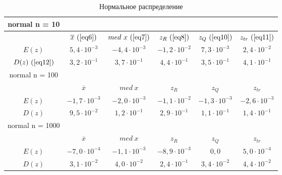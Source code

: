\begin{table}[H]
    \centering
    \begin{tabular}{ |c|c|c|c|c|c| } 
 \hline
 normal n = 10 & & & & & \\ 
 \hline
  &$\overline{x}\ (\ref{eq6})$ & $med\ x\ (\ref{eq7})$ & $z_{R}\ (\ref{eq8})$ & $z_{Q}\ (\ref{eq10})$ & $z_{tr}\ (\ref{eq11})$\\ 
 \hline
 $E(z)$ & $5,4 \cdot 10^{-3}$ & $-4,4\cdot 10^{-3}$ & $-1,2 \cdot 10^{-2}$ & $7,3 \cdot 10^{-3}$ & $2,4 \cdot 10^{-2}$ \\ 
 \hline
 $D(z)\ (\ref{eq12})$ & $3,2\cdot 10^{-1}$ & $3,7 \cdot 10^{-1}$ & $4,4 \cdot 10^{-1}$ & $3,5 \cdot 10^{-1}$ & $4,1 \cdot 10^{-1}$ \\ 
 \hline\hline
 normal n = 100 & & & & & \\
 \hline
 &$\overline{x}$ & $med\ x$ & $z_{R}$ & $z_{Q}$ & $z_{tr}$\\ 
 \hline
 $E(z)$ & $-1,7 \cdot 10^{-3}$ & $-2,0 \cdot 10^{-3}$ & $-1,1 \cdot 10^{-2}$ & $-1,3 \cdot 10^{-3}$ & $-2,6 \cdot 10^{-3}$ \\ 
 \hline
 $D(z)$ & $9,5 \cdot 10^{-2}$ & $1,2 \cdot 10^{-1}$ & $2,9 \cdot 10^{-1}$ & $1,1 \cdot 10^{-1}$ & $1,4 \cdot 10^{-1}$ \\ 
 \hline\hline
 normal n = 1000 & & & & & \\
 \hline
 &$\overline{x}$ & $med\ x$ & $z_{R}$ & $z_{Q}$ & $z_{tr}$\\ 
 \hline
 $E(z)$ & $-7,0 \cdot 10^{-4}$ & $-1,1 \cdot 10^{-3}$ & $-8,9 \cdot 10^{-3}$ & $0,0 $ & $5,0 \cdot 10^{-4}$ \\ 
 \hline
 $D(z)$ & $3,1 \cdot 10^{-2}$ & $4,0 \cdot 10^{-2}$ & $2,4 \cdot 10^{-1}$ & $3,4 \cdot 10^{-2}$ & $4,4 \cdot 10^{-2}$ \\
 \hline
\end{tabular}
    \caption{Нормальное распределение}
    \label{table:1}
\end{table}


